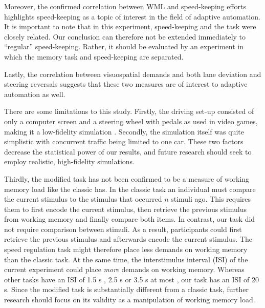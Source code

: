 Moreover, the confirmed correlation between WML and speed-keeping efforts highlights speed-keeping as a topic of interest in the field of adaptive automation.
It is important to note that in this experiment, speed-keeping and the \nback task were closely related.
Our conclusion can therefore not be extended immediately to ``regular'' speed-keeping. 
Rather, it should be evaluated by an experiment in which the memory task and speed-keeping are separated.

Lastly, the correlation between visuospatial demands and both lane deviation and steering reversals suggests that these two measures are of interest to adaptive automation as well.

There are some limitations to this study. 
Firstly, the driving set-up consisted of only a computer screen and a steering wheel with pedals as used in video games, making it a low-fidelity simulation \citep{Knappe2007}. 
Secondly, the simulation itself was quite simplistic with concurrent traffic being limited to one car.
These two factors decrease the statistical power of our results, and future research should seek to employ realistic, high-fidelity simulations.

Thirdly, the modified \nback task has not been confirmed to be a measure of working memory load like the classic \nback has.
In the classic \nback task an individual must compare the current stimulus to the stimulus that occurred \(n\) stimuli ago.
This requires them to first encode the current stimulus, then retrieve the previous stimulus from working memory and finally compare both items.
In contrast, our \nback task did not require comparison between stimuli.
As a result, participants could first retrieve the previous stimulus and afterwards encode the current stimulus.
The speed regulation task might therefore place less demands on working memory than the classic \nback task.
At the same time, the interstimulus interval (ISI) of the current experiment could place \textit{more} demands on working memory.
Whereas other \nback tasks have an ISI of 1.5 s \citep{Juvina2007}, 2.5 s \citep{Jaeggi2010,Miller2009} or 3.5 s at most \citep{Perlstein2003}, our task has an ISI of 20 s. 
Since the modified task is substantially different from a classic \nback task, further research should focus on its validity as a manipulation of working memory load.